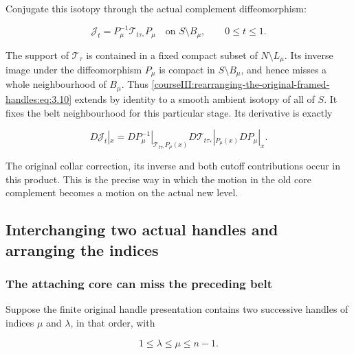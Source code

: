 Conjugate this isotopy through the actual complement diffeomorphism:

\begin{equation}
\mathcal J_t
=P_\mu^{-1}\mathcal T_{t\tau_*}P_\mu
\quad\text{on }S\setminus B_\mu,\qquad 0\leq t\leq1.
\label{courseIII:rearranging-the-original-framed-handles:eq:3.10}
\end{equation}

The support of \(\mathcal T_\tau\) is contained in a fixed compact subset of \(N\setminus L_\mu\). Its inverse image under the diffeomorphism \(P_\mu\) is compact in \(S\setminus B_\mu\), and hence misses a whole neighbourhood of \(B_\mu\). Thus \eqref{courseIII:rearranging-the-original-framed-handles:eq:3.10} extends by identity to a smooth ambient isotopy of all of \(S\). It fixes the belt neighbourhood for this particular stage. Its derivative is exactly

\begin{equation}
D\mathcal J_t|_x
=DP_\mu^{-1}|_{\mathcal T_{t\tau_*}P_\mu(x)}
 D\mathcal T_{t\tau_*}|_{P_\mu(x)}
 DP_\mu|_x.
\label{courseIII:rearranging-the-original-framed-handles:eq:3.11}
\end{equation}

The original collar correction, its inverse and both cutoff contributions occur in this product. This is the precise way in which the motion in the old core complement becomes a motion on the actual new level.

\subsection{Interchanging two actual handles and arranging the indices}
\label{courseIII:rearranging-the-original-framed-handles:arrangement-interchange}

\label{courseIII:rearranging-the-original-framed-handles:section-4}\label{courseIII:handle-arrangement:4}

\subsubsection{The attaching core can miss the preceding belt}
\label{courseIII:rearranging-the-original-framed-handles:section-4.1}

Suppose the finite original handle presentation contains two successive handles of indices \(\mu\) and \(\lambda\), in that order, with

\begin{equation}
1\leq\lambda\leq\mu\leq n-1.
\label{courseIII:rearranging-the-original-framed-handles:eq:4.1}
\end{equation}

